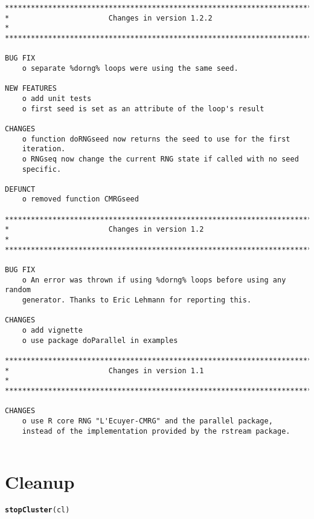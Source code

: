 \documentclass[a4paper,12pt]{article}\usepackage{graphicx, color}
\makeatletter
\newcommand{\hlfunctioncall}[1]{\textcolor[rgb]{0.501960784313725,0,0.329411764705882}{\textbf{#1}}}%
\newenvironment{kframe}{%
 \def\at@end@of@kframe{}%
 \ifinner\ifhmode%
  \def\at@end@of@kframe{\end{minipage}}%
  \begin{minipage}{\columnwidth}%
 \fi\fi%
 \def\FrameCommand##1{\hskip\@totalleftmargin \hskip-\fboxsep
 \colorbox{shadecolor}{##1}\hskip-\fboxsep
     \hskip-\linewidth \hskip-\@totalleftmargin \hskip\columnwidth}%
 \MakeFramed {\advance\hsize-\width
   \@totalleftmargin\z@ \linewidth\hsize
   \@setminipage}}%
 {\par\unskip\endMakeFramed%
 \at@end@of@kframe}
\newenvironment{knitrout}{}{} %
\renewenvironment{knitrout}{\begin{footnotesize}}{\end{footnotesize}}
\makeatother
\begin{document}
{\begin{verbatim}
*************************************************************************
*                       Changes in version 1.2.2                        *
*************************************************************************

BUG FIX
    o separate %dorng% loops were using the same seed.

NEW FEATURES
    o add unit tests
    o first seed is set as an attribute of the loop's result

CHANGES
    o function doRNGseed now returns the seed to use for the first 
    iteration.
    o RNGseq now change the current RNG state if called with no seed 
    specific.  
    
DEFUNCT
    o removed function CMRGseed

*************************************************************************
*                       Changes in version 1.2                          *
*************************************************************************

BUG FIX
    o An error was thrown if using %dorng% loops before using any random
    generator. Thanks to Eric Lehmann for reporting this.

CHANGES
    o add vignette
    o use package doParallel in examples

*************************************************************************
*                       Changes in version 1.1                          *
*************************************************************************

CHANGES
    o use R core RNG "L'Ecuyer-CMRG" and the parallel package, 
    instead of the implementation provided by the rstream package.


\end{verbatim}
}


\section*{Cleanup}
\begin{knitrout}
\color{fgcolor}\begin{kframe}
\begin{alltt}
\hlfunctioncall{stopCluster}(cl)
\end{alltt}
\end{kframe}
\end{knitrout}
\end{document}
